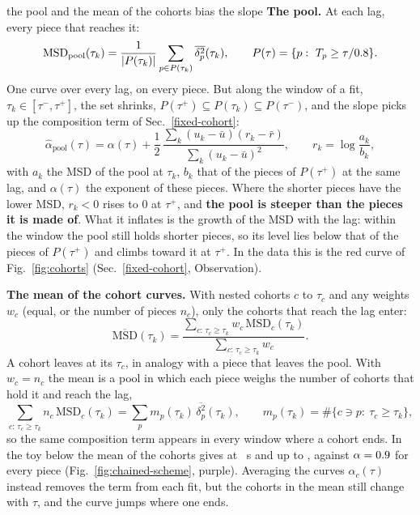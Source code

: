 \documentclass[10pt,a4paper]{article}
\begin{document}
\begin{problembox}{the pool and the mean of the cohorts bias the slope}
  \textbf{The pool.} At each lag, every piece that reaches it:
  \[ \mathrm{MSD}_\mathrm{pool}(\tau_k)=\frac{1}{|P(\tau_k)|}\sum_{p\in P(\tau_k)}\overline{\delta^2_p}(\tau_k),\qquad
     P(\tau)=\{p:\ T_p\ge\tau/0.8\}. \]
  One curve over every lag, on every piece. But along the window of a fit, $\tau_k\in[\tau^-,\tau^+]$, the set
  shrinks, $P(\tau^+)\subseteq P(\tau_k)\subseteq P(\tau^-)$, and the slope picks up the composition term of
  Sec.~\ref{fixed-cohort}:
  \[ \hat\alpha_\mathrm{pool}(\tau)=\alpha(\tau)+\frac12\,\frac{\sum_k(u_k-\bar u)(r_k-\bar r)}{\sum_k(u_k-\bar u)^2},
     \qquad r_k=\log\frac{a_k}{b_k}, \]
  with $a_k$ the MSD of the pool at $\tau_k$, $b_k$ that of the pieces of $P(\tau^+)$ at the same lag, and
  $\alpha(\tau)$ the exponent of these pieces. Where the shorter pieces have the lower MSD, $r_k<0$ rises to 0 at
  $\tau^+$, and \textbf{the pool is steeper than the pieces it is made of}. What it inflates is the growth of the
  MSD with the lag: within the window the pool still holds shorter pieces, so its level lies below that of the
  pieces of $P(\tau^+)$ and climbs toward it at $\tau^+$. In the
  data this is the red curve of Fig.~\ref{fig:cohorts} (Sec.~\ref{fixed-cohort}, Observation).

  \textbf{The mean of the cohort curves.} With nested cohorts $c$ to $\tau_c$ and any weights $w_c$ (equal, or the
  number of pieces $n_c$), only the cohorts that reach the lag enter:
  \[ \overline{\mathrm{MSD}}(\tau_k)=\frac{\sum_{c:\,\tau_c\ge\tau_k}w_c\,\mathrm{MSD}_c(\tau_k)}{\sum_{c:\,\tau_c\ge\tau_k}w_c}. \]
  A cohort leaves at its $\tau_c$, in analogy with a piece that leaves the pool. With $w_c=n_c$ the mean is a
  pool in which each piece weighs the number of cohorts that hold it and reach the lag,
  \[ \sum_{c:\,\tau_c\ge\tau_k}n_c\,\mathrm{MSD}_c(\tau_k)=\sum_p m_p(\tau_k)\,\overline{\delta^2_p}(\tau_k),\qquad
     m_p(\tau_k)=\#\{c\ni p:\ \tau_c\ge\tau_k\}, \]
  so the same composition term appears in every window where a cohort ends. In the toy below the mean of the
  cohorts gives \ToyPlMean{} at \ToyPlTau~s and up to \ToyPlMeanMax, against $\alpha=0.9$ for every
  piece (Fig.~\ref{fig:chained-scheme}, purple). Averaging the curves $\alpha_c(\tau)$ instead removes the term
  from each fit, but the cohorts in the mean still change with $\tau$, and the curve jumps where one ends.
\end{problembox}
\end{document}
